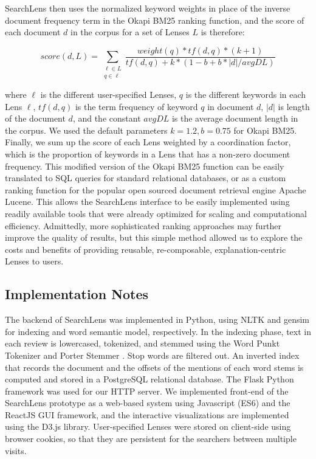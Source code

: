SearchLens then uses the normalized keyword weights in place of the inverse document frequency term in the Okapi BM25 ranking function, and the score of each document $d$ in the corpus for a set of Lenses $L$ is therefore:

$$score(d, L) = \sum_{\substack{\ell \in L \\ q \in \ell}}\frac{weight(q) * tf(d, q) * (k+1)} { tf(d, q) + k * (1 - b + b *|d| / avgDL)}$$

where $\ell$ is the different user-specified Lenses, $q$ is the different keywords in each Lens $\ell$, $tf(d,q)$ is the term frequency of keyword $q$ in document $d$, $|d|$ is length of the document $d$, and the constant $avgDL$ is the average document length in the corpus. We used the default parameters $k=1.2, b=0.75$ for Okapi BM25. Finally, we sum up the score of each Lens weighted by a coordination factor, which is the proportion of keywords in a Lens that has a non-zero document frequency. This modified version of the Okapi BM25 function can be easily translated to SQL queries for standard relational databases, or as a custom ranking function for the popular open sourced document retrieval engine Apache Lucene. This allows the SearchLens interface to be easily implemented using readily available tools that were already optimized for scaling and computational efficiency. Admittedly, more sophisticated ranking approaches may further improve the quality of results, but this simple method allowed us to explore the costs and benefits of providing reusable, re-composable, explanation-centric Lenses to users.


\subsection{Implementation Notes}


The backend of SearchLens was implemented in Python, using NLTK \cite{bird2004nltk} and gensim \cite{rehurek_lrec} for indexing and word semantic model, respectively. In the indexing phase, text in each review is lowercased, tokenized, and stemmed using the Word Punkt Tokenizer \cite{jurish2013word} and Porter Stemmer \cite{van1980new}. Stop words are filtered out. An inverted index that records the document and the offsets of the mentions of each word stems is computed and stored in a PostgreSQL relational database. The Flask Python framework was used for our HTTP server. We implemented front-end of the SearchLens prototype as a web-based system using Javascript (ES6) and the ReactJS GUI framework, and the interactive visualizations are implemented using the D3.js library. User-specified Lenses were stored on client-side using browser cookies, so that they are persistent for the searchers between multiple visits.

